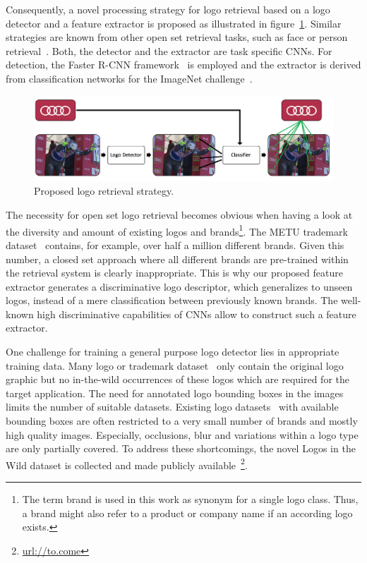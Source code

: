 \documentclass[a4paper,twoside]{article}
\begin{document}
Consequently, a novel processing strategy for logo retrieval based on a logo detector and a feature extractor is proposed as illustrated in figure~\ref{fig:pipeline}. Similar strategies are known from other open set retrieval tasks, such as face or person retrieval~\cite{bauml2010,herrmann2015b}. Both, the detector and the extractor are task specific \acp{CNN}. For detection, the Faster R-CNN framework~\cite{ren2015} is employed and the extractor is derived from classification networks for the ImageNet challenge~\cite{deng2009}.
%
\begin{figure}[t]
  \centering
  \includegraphics[width=\linewidth]{img/outline.png}
  \caption{Proposed logo retrieval strategy.}
  \label{fig:pipeline}
\end{figure}

The necessity for open set logo retrieval becomes obvious when having a look at the diversity and amount of existing logos and brands\footnote{The term brand is used in this work as synonym for a single logo class. Thus, a brand might also refer to a product or company name if an according logo exists.}. The METU trademark dataset~\cite{tursun2017} contains, for example, over half a million different brands. Given this number, a closed set approach where all different brands are pre-trained within the retrieval system is clearly inappropriate.
This is why our proposed feature extractor generates a discriminative logo descriptor, which generalizes to unseen logos, instead of a mere classification between previously known brands. The well-known high discriminative capabilities of \acp{CNN} allow to construct such a feature extractor.

One challenge for training a general purpose logo detector lies in appropriate training data. Many logo or trademark dataset~\cite{eakins1998,hoi2015,tursun2017} only contain the original logo graphic but no in-the-wild occurrences of these logos which are required for the target application. The need for annotated logo bounding boxes in the images limits the number of suitable datasets. Existing logo datasets~\cite{joly2009,kalantidis2011,romberg2011,letessier2012,bianco2015,su2016,bianco2017} with available bounding boxes are often restricted to a very small number of brands and mostly high quality images. Especially, occlusions, blur and variations within a logo type are only partially covered.
To address these shortcomings, the novel Logos in the Wild dataset is collected and made publicly available~\footnote{\url{url://to.come}}.
\end{document}
